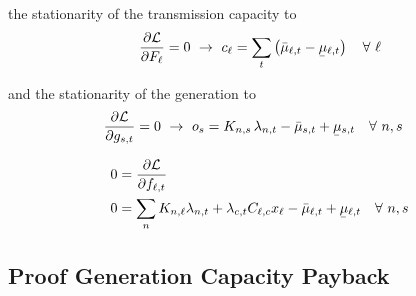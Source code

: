 \documentclass[11pt,twocolumn]{article}
\newcommand{\ubar}[1]{\underaccent{\bar}{#1}}
\newcommand{\Forall}[1]{\hspace{10pt} \forall \,\, #1 }
\newcommand{\pdv}[2]{\frac{\partial #1}{\partial #2}}
\newcommand{\generation}{g_{s,t}}
\newcommand{\capacityflow}{F_{\ell}}
\newcommand{\capitalpriceflow}{c_{\ell}}
\newcommand{\operationalpricegeneration}{o_{s}}
\newcommand{\incidence}[1][n]{K_{#1,\ell}}
\newcommand{\incidencegenerator}[1][n]{K_{#1,s}}
\newcommand{\mulowergeneration}{\ubar{\mu}_{s,t}}
\newcommand{\muuppergeneration}{\bar{\mu}_{s,t}}
\newcommand{\mulowerflow}{\ubar{\mu}_{\ell,t}}
\newcommand{\muupperflow}{\bar{\mu}_{\ell,t}}
\newcommand{\lmp}[1][n]{\lambda_{#1,t}}
\newcommand{\flow}{f_{\ell,t}}
\newcommand{\cycle}{C_{\ell,c}}
\newcommand{\impedance}{x_\ell}
\newcommand{\cycleprice}{\lambda_{c,t}}
\newcommand{\lagrangian}{\mathcal{L}}
\begin{document}
the stationarity of the transmission capacity to
\begin{align}
\pdv{\lagrangian}{\capacityflow} = 0 \,\, \rightarrow \,\, 
\capitalpriceflow =  \sum_t \left( \muupperflow - \mulowerflow \right) \Forall{\ell}
\label{eq:capexFlow_duality}
\end{align}


and the stationarity of the generation to 
\begin{align}
\pdv{\lagrangian}{\generation} &= 0 \,\, \rightarrow \,\,  
\operationalpricegeneration =  \incidencegenerator \, \lmp - \muuppergeneration + \mulowergeneration \Forall{n,s} \label{eq:opex_duality}
\end{align}

\begin{align}
0 &= \pdv{\lagrangian}{\flow}  \\ 
0 &= \sum_n \incidence \lmp  + \cycleprice \cycle \impedance  - \muupperflow + \mulowerflow \Forall{n,s} \label{eq:opex_flow_duality}
\end{align}



\subsection{Proof Generation Capacity Payback}
\label{sec:zero_profit_generation}
\end{document}
